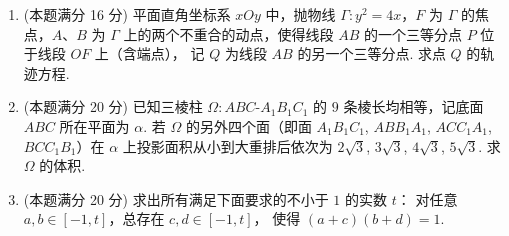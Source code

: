 \documentclass{chsmc}
\begin{document}
\begin{enumerate}[resume]
  \item (本题满分 16 分) 平面直角坐标系 $xOy$ 中，抛物线
    $\Gamma\colon y^2 = 4x$，$F$ 为 $\Gamma$ 的焦点，$A$、$B$ 为 $\Gamma$
    上的两个不重合的动点，使得线段 $AB$ 的一个三等分点 $P$ 位于线段 $OF$ 上（含端点），
    记 $Q$ 为线段 $AB$ 的另一个三等分点. 求点 $Q$ 的轨迹方程.
  \item (本题满分 20 分) 已知三棱柱 $\Omega\colon ABC\text{-}A_1B_1C_1$
    的 $9$ 条棱长均相等，记底面 $ABC$ 所在平面为 $\alpha$.
    若 $\Omega$ 的另外四个面（即面 $A_1B_1C_1$, $ABB_1A_1$, $ACC_1A_1$,
    $BCC_1B_1$）在 $\alpha$ 上投影面积从小到大重排后依次为
    $2\sqrt{3}$, $3\sqrt{3}$, $4\sqrt{3}$, $5\sqrt{3}$.
    求 $\Omega$ 的体积.
  \item (本题满分 20 分) 求出所有满足下面要求的不小于 $1$ 的实数 $t$：
    对任意 $a, b \in [-1,t]$，总存在 $c, d \in [-1,t]$，
    使得 $(a+c)(b+d) = 1$.
\end{enumerate}
\end{document}
